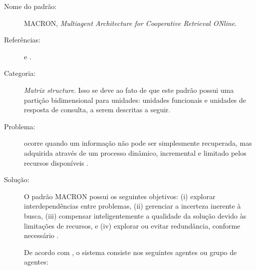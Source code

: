 \begin{description}
  \item[Nome do padrão:] MACRON, \textit{Multiagent Architecture for Cooperative Retrieval ONline}.
  
    \item[Referências:]     e .
    
    \item[Categoria:] \textit{Matrix structure}. Isso se deve ao fato de que este padrão possui uma partição bidimensional para unidades: unidades funcionais e unidades de resposta de consulta, a serem descritas a seguir.
    
    \item[Problema:] ocorre quando um informação não pode ser simplesmente recuperada, mas adquirida através de um processo dinâmico, incremental e limitado pelos recursos disponíveis \cite{decker1995macron}.

    \item[Solução:] 

    O padrão MACRON possui os seguintes objetivos: (i) explorar interdependências entre problemas, (ii) gerenciar a incerteza inerente à busca, (iii) compensar inteligentemente a qualidade da solução devido às limitações de recursos, e (iv) explorar ou evitar redundância, conforme necessário \cite{decker1995macron}. 
   
    De acordo com , o sistema consiste nos seguintes agentes ou grupo de agentes:


\end{description}
